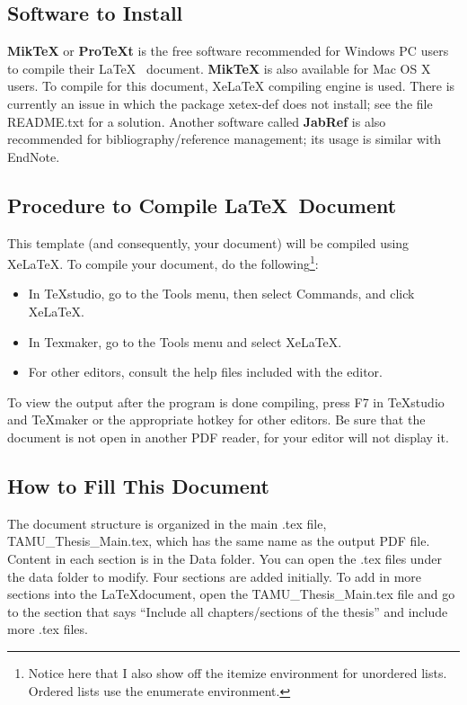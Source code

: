 \subsection*{Software to Install}

\textbf{MikTeX} or \textbf{ProTeXt} is the free software recommended for Windows PC users to
compile their \LaTeX ~ document. \textbf{MikTeX} is also available for Mac OS X users. To compile for this document, XeLaTeX compiling engine is used. There is currently an issue in which the package xetex-def does not install; see the file README.txt for a solution. Another software called \textbf{JabRef} is also recommended for bibliography/reference management; its usage is similar with EndNote.

\subsection*{Procedure to Compile \LaTeX\ Document}

This template (and consequently, your document) will be compiled using XeLaTeX. To compile your document, do the following\footnote{Notice here that I also show off the itemize environment for unordered lists. Ordered lists use the enumerate environment.}:

\begin{itemize}
	\item In TeXstudio, go to the Tools menu, then select Commands, and click XeLaTeX.
	
	\item In Texmaker, go to the Tools menu and select XeLaTeX.
	
	\item For other editors, consult the help files included with the editor.
\end{itemize}

To view the output after the program is done compiling, press F7 in TeXstudio and TeXmaker or the appropriate hotkey for other editors. Be sure that the document is not open in another PDF reader, for your editor will not display it.

\subsection{How to Fill This Document}
The document structure is organized in the main .tex file, TAMU\_Thesis\_Main.tex,
which has the same name as the output PDF file. Content in each section is in the Data folder. You can open the .tex files under the data folder to modify. Four sections
are added initially. To add in more sections into the \LaTeX document, open the
TAMU\_Thesis\_Main.tex file and go to the section that says ``Include all chapters/sections of the thesis'' and include more .tex files.


